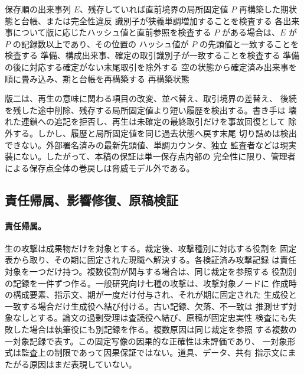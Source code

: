 \algrenewcommand{}
\algrenewcommand{}
\algrenewcommand{}
\begin{algorithm}[htbp]
\caption{再開時の決定論的な状態再構築}
\begin{algorithmic}[1]
\Require 保存順の出来事列 $E$、残存していれば直前境界の局所固定値 $P$
\Ensure 再構築した期状態と台帳、または完全性違反
\State 識別子が狭義単調増加することを検査する
\State 各出来事について版に応じたハッシュ値と直前参照を検査する
\State $P$ がある場合は、$E$ が $P$ の記録数以上であり、その位置の
ハッシュ値が $P$ の先頭値と一致することを検査する
\State 準備、構成出来事、確定の取引識別子が一致することを検査する
\State 準備の後に対応する確定がない末尾取引を除外する
\State 空の状態から確定済み出来事を順に畳み込み、期と台帳を再構築する
\State \Return 再構築状態
\end{algorithmic}
\end{algorithm}

版二は、再生の意味に関わる項目の改変、並べ替え、取引境界の差替え、
後続を残した途中削除、残存する局所固定値より短い履歴を検出する。書き手は
壊れた連鎖への追記を拒否し、再生は未確定の最終取引だけを事故回復として
除外する。しかし、履歴と局所固定値を同じ過去状態へ戻す末尾
切り詰めは検出できない。外部署名済みの最新先頭値、単調カウンタ、独立
監査者などは現実装にない。したがって、本稿の保証は単一保存点内部の
完全性に限り、管理者による保存点全体の巻戻しは脅威モデル外である。

\subsection{責任帰属、影響修復、原稿検証}\label{sec:appendix:algorithms}

\paragraph{責任帰属。}
生の攻撃は成果物だけを対象とする。裁定後、攻撃種別に対応する役割を
固定表から取り、その期に固定された現職へ解決する。各検証済み攻撃記録
は責任対象を一つだけ持つ。複数役割が関与する場合は、同じ裁定を参照する
役割別の記録を一件ずつ作る。一般研究向け七種の攻撃は、攻撃対象ノードに
作成時の構成要素、指示文、期が一度だけ付与され、それが期に固定された
生成役と一致する場合だけ生成役へ結び付ける。古い記録、欠落、不一致は
推測せず対象なしとする。論文の過剰受理は査読役へ結び、原稿が固定忠実性
検査にも失敗した場合は執筆役にも別記録を作る。複数原因は同じ裁定を参照
する複数の一対象記録で表す。この固定写像の因果的な正確性は未評価であり、
一対象形式は監査上の制限であって因果保証ではない。道具、データ、共有
指示文にまたがる原因はまだ表現していない。

